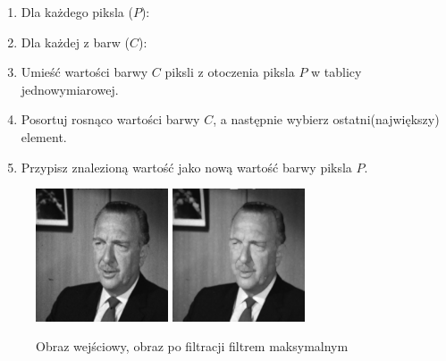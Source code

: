 \documentclass[final,a4paper,openany,12pt]{mwbk}
\begin{document}
\begin{enumerate}
	\item Dla każdego piksla ($P$):
	\item Dla każdej z barw ($C$):
	\item Umieść wartości barwy $C$ piksli z otoczenia piksla $P$ w tablicy jednowymiarowej.
	\item Posortuj rosnąco wartości barwy $C$, a następnie wybierz ostatni(największy) element.
	\item Przypisz znalezioną wartość jako nową wartość barwy piksla $P$.
\end{enumerate}

\begin{figure}[H]
	\begin{center}
		\includegraphics[width=0.35\textwidth]{gentelman_gray}
		\includegraphics[width=0.35\textwidth]{gentelman_gray_max_result}
	\end{center}
	\caption{Obraz wejściowy, obraz po filtracji filtrem maksymalnym}
\end{figure}
\end{document}

